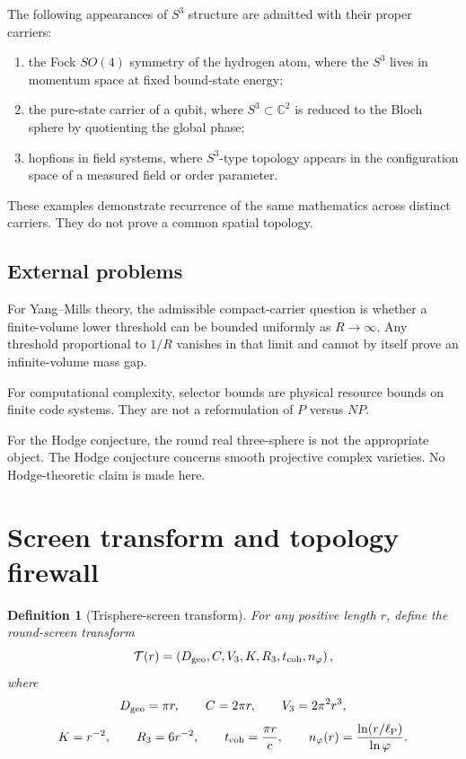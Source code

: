 \documentclass[11pt,a4paper]{article}
\newtheorem{definition}[theorem]{Definition}
\newcommand{\ellP}{\ell_{\rm P}}
\begin{document}
The following appearances of \(S^3\) structure are admitted with their proper carriers:
\begin{enumerate}
\item the Fock \(SO(4)\) symmetry of the hydrogen atom, where the \(S^3\) lives in momentum space at fixed bound-state energy;
\item the pure-state carrier of a qubit, where \(S^3\subset\mathbb C^2\) is reduced to the Bloch sphere by quotienting the global phase;
\item hopfions in field systems, where \(S^3\)-type topology appears in the configuration space of a measured field or order parameter.
\end{enumerate}
These examples demonstrate recurrence of the same mathematics across distinct carriers.  They do not prove a common spatial topology.

\subsection{External problems}

For Yang--Mills theory, the admissible compact-carrier question is whether a finite-volume lower threshold can be bounded uniformly as \(R\to\infty\).  Any threshold proportional to \(1/R\) vanishes in that limit and cannot by itself prove an infinite-volume mass gap.

For computational complexity, selector bounds are physical resource bounds on finite code systems.  They are not a reformulation of \(P\) versus \(NP\).

For the Hodge conjecture, the round real three-sphere is not the appropriate object.  The Hodge conjecture concerns smooth projective complex varieties.  No Hodge-theoretic claim is made here.


\section{Screen transform and topology firewall}
\label{sec:screen-transform}

\begin{definition}[Trisphere-screen transform]
For any positive length $r$, define the round-screen transform
\[
\mathcal T(r)=
\left(
D_{\rm geo},C,V_3,K,R_3,t_{\rm coh},n_\varphi
\right),
\]
where
\[
D_{\rm geo}=\pi r,\qquad
C=2\pi r,\qquad
V_3=2\pi^2r^3,
\]
\[
K=r^{-2},\qquad
R_3=6r^{-2},\qquad
t_{\rm coh}=\frac{\pi r}{c},
\qquad
n_\varphi(r)=\frac{\ln(r/\ellP)}{\ln\varphi}.
\]
\end{definition}
\end{document}
